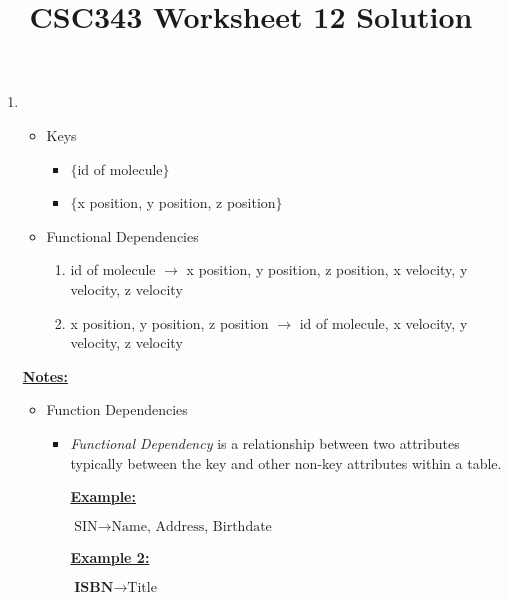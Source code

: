 \documentclass[12pt]{article}
\begin{document}
\title{CSC343 Worksheet 12 Solution}
\maketitle

\begin{enumerate}[1.]
    \item

    \begin{itemize}
        \item Keys
        \begin{itemize}
            \item $\{$id of molecule$\}$
            \item $\{$x position, y position, z position$\}$
        \end{itemize}
        \item Functional Dependencies
        \begin{enumerate}[1.]
            \item id of molecule $\to$ x position, y position, z position, x velocity, y velocity, z velocity
            \item x position, y position, z position $\to$ id of molecule, x velocity, y velocity, z velocity
        \end{enumerate}
    \end{itemize}

    \bigskip

    \underline{\textbf{Notes:}}

    \bigskip

    \begin{itemize}
        \item Function Dependencies
        \begin{itemize}
            \item \textit{Functional Dependency} is a relationship between two attributes
            typically between the key and other non-key attributes within a table.


            \bigskip

            \underline{\textbf{Example:}}

            \bigskip

            $\text{SIN} \to \text{Name, Address, Birthdate}$

            \bigskip

            \underline{\textbf{Example 2:}}

            \bigskip

            $\textbf{ISBN} \to \text{Title}$


\end{itemize}
\end{itemize}
\end{enumerate}
\end{document}
